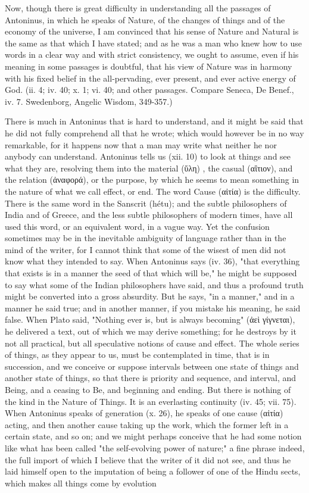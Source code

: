Now, though there is great difficulty in understanding all the passages of Antoninus, in which he speaks of Nature, of the changes of things and of the economy of the universe, I am convinced that his sense of Nature and Natural is the same as that which I have stated; and as he was a man who knew how to use words in a clear way and with strict consistency, we ought to assume, even if his meaning in some passages is doubtful, that his view of Nature was in harmony with his fixed belief in the all-pervading, ever present, and ever active energy of God. (ii. 4; iv. 40; x. 1; vi. 40; and other passages. Compare Seneca, De Benef., iv. 7. Swedenborg, Angelic Wisdom, 349-357.)

There is much in Antoninus that is hard to understand, and it might be said that he did not fully comprehend all that he wrote; which would however be in no way remarkable, for it happens now that a man may write what neither he nor anybody can understand. Antoninus tells us (xii. 10) to look at things and see what they are, resolving them into the material (\textgreek{ὕλη}) , the casual (\textgreek{αἲτιον}), and the relation (\textgreek{ἀναφορά}), or the purpose, by which he seems to mean something in the nature of what we call effect, or end. The word Cause (\textgreek{αἰτία}) is the difficulty. There is the same word in the Sanscrit (hétu); and the subtle philosophers of India and of Greece, and the less subtle philosophers of modern times, have all used this word, or an equivalent word, in a vague way. Yet the confusion sometimes may be in the inevitable ambiguity of language rather than in the mind of the writer, for I cannot think that some of the wisest of men did not know what they intended to say. When Antoninus says (iv. 36), "that everything that exists is in a manner the seed of that which will be," he might be supposed to say what some of the Indian philosophers have said, and thus a profound truth might be converted into a gross absurdity. But he says, "in a manner," and in a manner he said true; and in another manner, if you mistake his meaning, he said false. When Plato said, "Nothing ever is, but is always becoming" (\textgreek{ἀεὶ γίγνεται}), he delivered a text, out of which we may derive something; for he destroys by it not all practical, but all speculative notions of cause and effect. The whole series of things, as they appear to us, must be contemplated in time, that is in succession, and we conceive or suppose intervals between one state of things and another state of things, so that there is priority and sequence, and interval, and Being, and a ceasing to Be, and beginning and ending. But there is nothing of the kind in the Nature of Things. It is an everlasting continuity (iv. 45; vii. 75). When Antoninus speaks of generation (x. 26), he speaks of one cause (\textgreek{αἰτία}) acting, and then another cause taking up the work, which the former left in a certain state, and so on; and we might perhaps conceive that he had some notion like what has been called "the self-evolving power of nature;" a fine phrase indeed, the full import of which I believe that the writer of it did not see, and thus he laid himself open to the imputation of being a follower of one of the Hindu sects, which makes all things come by evolution 
